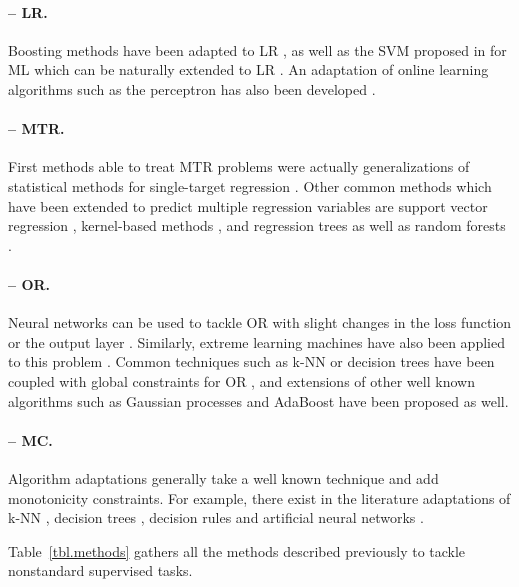 \documentclass[
	fontsize=11pt, %
	twoside=false, %
	open=any, %
	secnumdepth=1, %
]{kaobook}
\begin{document}
\paragraph{-- LR.} Boosting methods have been adapted to LR \cite{lr-boost}, as well as the SVM proposed in \cite{ml-svm} for ML which can be naturally extended to LR \cite{lranksurvey}. An adaptation of online learning algorithms such as the perceptron has also been developed \cite{lr-online}.

\paragraph{-- MTR.} First methods able to treat MTR problems were actually generalizations of statistical methods for single-target regression \cite{mtr-rank,mtr-canon}. Other common methods which have been extended to predict multiple regression variables are support vector regression \cite{mtr-svr1,mtr-svr2}, kernel-based methods \cite{mtr-kern1,mtr-kern2}, and regression trees \cite{mtr-trees} as well as random forests \cite{mtr-rf}.

\paragraph{-- OR.} Neural networks can be used to tackle OR with slight changes in the loss function or the output layer \cite{or-nn,or-nn2}. Similarly, extreme learning machines have also been applied to this problem \cite{or-elm,or-elm2}. Common techniques such as k-NN or decision trees have been coupled with global constraints for OR \cite{or-knn-dt}, and extensions of other well known algorithms such as Gaussian processes \cite{or-gp} and AdaBoost \cite{or-ada} have been proposed as well.

\paragraph{-- MC.} Algorithm adaptations generally take a well known technique and add monotonicity constraints. For example, there exist in the literature adaptations of k-NN \cite{mc-knn}, decision trees \cite{mc-trees}, decision rules \cite{mc-rules,mc-rules2} and artificial neural networks \cite{mc-monnets}.

\vspace{1em}

Table~\ref{tbl.methods} gathers all the methods described previously to tackle nonstandard supervised tasks.
\end{document}
